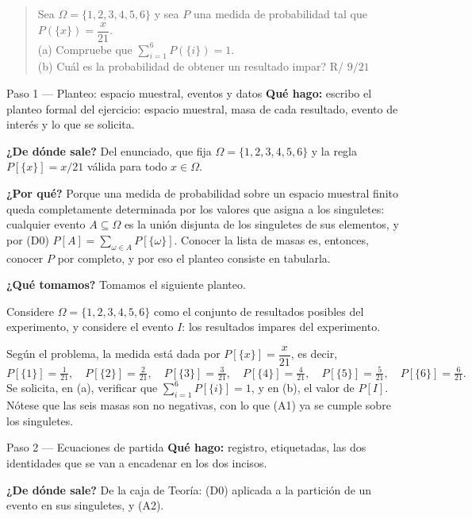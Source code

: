 \documentclass[11pt]{article}
\begin{document}
\begin{quote}
Sea $\Omega=\{1,2,3,4,5,6\}$ y sea $P$ una medida de probabilidad tal que
$P(\{x\})=\dfrac{x}{21}$.\\
(a) Compruebe que $\sum_{i=1}^{6}P(\{i\})=1$.\\
(b) Cuál es la probabilidad de obtener un resultado impar? \hfill R/ $9/21$
\end{quote}

\begin{sol}

\begin{paso}{Paso 1 --- Planteo: espacio muestral, eventos y datos}
\textbf{Qué hago:} escribo el planteo formal del ejercicio: espacio muestral, masa de cada
resultado, evento de interés y lo que se solicita.

\textbf{¿De dónde sale?} Del enunciado, que fija $\Omega=\{1,2,3,4,5,6\}$ y la regla
$P[\{x\}]=x/21$ válida para todo $x\in\Omega$.

\textbf{¿Por qué?} Porque una medida de probabilidad sobre un espacio muestral finito queda
completamente determinada por los valores que asigna a los singuletes: cualquier evento
$A\subseteq\Omega$ es la unión disjunta de los singuletes de sus elementos, y por (D0)
$P[A]=\sum_{\omega\in A}P[\{\omega\}]$. Conocer la lista de masas es, entonces, conocer $P$ por
completo, y por eso el planteo consiste en tabularla.

\textbf{¿Qué tomamos?} Tomamos el siguiente planteo.

\medskip
Considere $\Omega=\{1,2,3,4,5,6\}$ como el conjunto de resultados posibles del experimento, y
considere el evento $I$: los resultados impares del experimento.

Según el problema, la medida está dada por $P[\{x\}]=\dfrac{x}{21}$, es decir,
\[
P[\{1\}]=\tfrac{1}{21},\quad P[\{2\}]=\tfrac{2}{21},\quad P[\{3\}]=\tfrac{3}{21},\quad
P[\{4\}]=\tfrac{4}{21},\quad P[\{5\}]=\tfrac{5}{21},\quad P[\{6\}]=\tfrac{6}{21}.
\]
Se solicita, en (a), verificar que $\sum_{i=1}^{6}P[\{i\}]=1$, y en (b), el valor de $P[I]$.
Nótese que las seis masas son no negativas, con lo que (A1) ya se cumple sobre los singuletes.
\end{paso}

\begin{paso}{Paso 2 --- Ecuaciones de partida}
\textbf{Qué hago:} registro, etiquetadas, las dos identidades que se van a encadenar en los dos
incisos.

\textbf{¿De dónde sale?} De la caja de Teoría: (D0) aplicada a la partición de un evento en sus
singuletes, y (A2).


\end{paso}
\end{sol}
\end{document}
